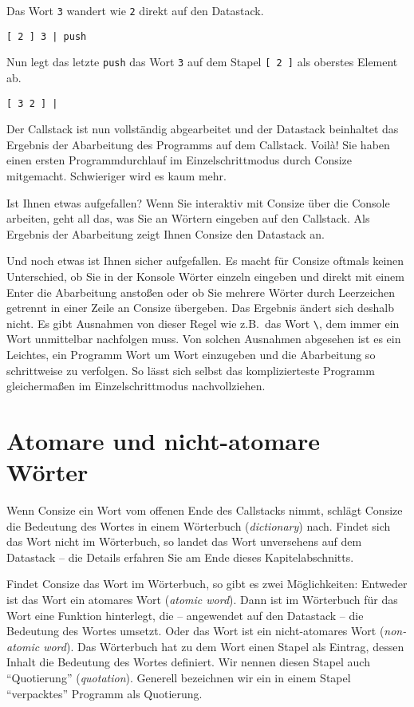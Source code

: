 Das Wort \verb|3| wandert wie \verb|2| direkt auf den Datastack.

\begin{verbatim}
[ 2 ] 3 | push
\end{verbatim}

Nun legt das letzte \verb|push| das Wort \verb|3| auf dem Stapel \verb|[ 2 ]| als oberstes Element ab.

\begin{verbatim}
[ 3 2 ] |
\end{verbatim}

Der Callstack ist nun vollständig abgearbeitet und der Datastack beinhaltet das Ergebnis der Abarbeitung des Programms auf dem Callstack. Voil\`a! Sie haben einen ersten Programmdurchlauf im Einzelschrittmodus durch Consize mitgemacht. Schwieriger wird es kaum mehr.

Ist Ihnen etwas aufgefallen? Wenn Sie interaktiv mit Consize über die Console arbeiten, geht all das, was Sie an Wörtern eingeben auf den Callstack. Als Ergebnis der Abarbeitung zeigt Ihnen Consize den Datastack an.

Und noch etwas ist Ihnen sicher aufgefallen. Es macht für Consize oftmals keinen Unterschied, ob Sie in der Konsole Wörter einzeln eingeben und direkt mit einem {\sc Enter} die Abarbeitung anstoßen oder ob Sie mehrere Wörter durch Leerzeichen getrennt in einer Zeile an Consize übergeben. Das Ergebnis ändert sich deshalb nicht. Es gibt Ausnahmen von dieser Regel wie z.B.\ das Wort \verb|\|, dem immer ein Wort unmittelbar nachfolgen muss. Von solchen Ausnahmen abgesehen ist es ein Leichtes, ein Programm Wort um Wort einzugeben und die Abarbeitung so schrittweise zu verfolgen. So lässt sich selbst das komplizierteste Programm gleichermaßen im Einzelschrittmodus nachvollziehen.

\section{Atomare und nicht-atomare Wörter}
\label{Sec:AtomareWoerter}

Wenn Consize ein Wort vom offenen Ende des Callstacks nimmt, schlägt Consize die Bedeutung des Wortes in einem Wör\-ter\-buch (\emph{dictionary}) nach. Findet sich das Wort nicht im Wörterbuch, so landet das Wort unversehens auf dem Datastack -- die Details erfahren Sie am Ende dieses Kapitelabschnitts.

Findet Consize das Wort im Wörterbuch, so gibt es zwei Möglichkeiten: Entweder ist das Wort ein atomares Wort (\emph{atomic word}). Dann ist im Wörterbuch für das Wort eine Funktion hinterlegt, die -- angewendet auf den Datastack -- die Bedeutung des Wortes umsetzt. Oder das Wort ist ein nicht-atomares Wort (\emph{non-atomic word}). Das Wörterbuch hat zu dem Wort einen Stapel als Eintrag, dessen Inhalt die Bedeutung des Wortes definiert. Wir nennen diesen Stapel auch "`Quotierung"' (\emph{quotation}). Generell bezeichnen wir ein in einem Stapel "`verpacktes"' Programm als Quotierung.

